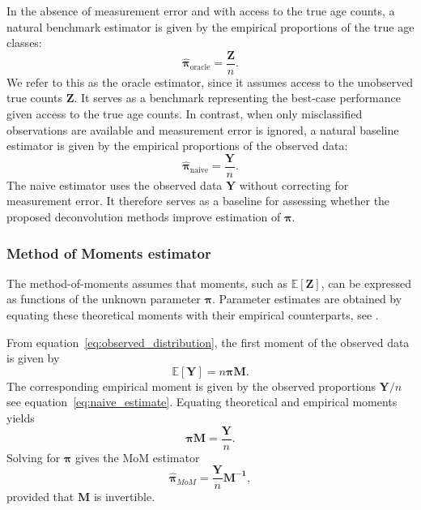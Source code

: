 \documentclass[11pt,a4paper]{article}
\begin{document}
In the absence of measurement error and with access to the true age counts, a natural benchmark estimator is given by the empirical proportions of the true age classes:
\begin{equation*}
	\hat{\boldsymbol{\pi}}_{\text{oracle}} = \frac{\mathbf{Z}}{n}.
	\label{eq:oracle_estimate}
\end{equation*}
We refer to this as the oracle estimator, since it assumes access to the unobserved true counts $\mathbf{Z}$. It serves as a benchmark representing the best-case performance given access to the true age counts. In contrast, when only misclassified observations are available and measurement error is ignored, a natural baseline estimator is given by the empirical proportions of the observed data:
\begin{equation}
	\hat{\boldsymbol{\pi}}_{\text{naive}} = \frac{\mathbf{Y}}{n}.
	\label{eq:naive_estimate}
\end{equation}
The naive estimator uses the observed data $\mathbf{Y}$ without correcting for measurement error. It therefore serves as a baseline for assessing whether the proposed deconvolution methods improve estimation of $\boldsymbol{\pi}$.


\subsubsection{Method of Moments estimator}

The method-of-moments assumes that moments, such as $\mathbb{E}[\mathbf{Z}]$, can be expressed as functions of the unknown parameter $\boldsymbol{\pi}$. Parameter estimates are obtained by equating these theoretical moments with their empirical counterparts, see \cite[p.~275]{AlmBritton2008}. 

From equation~\eqref{eq:observed_distribution}, the first moment of the observed data is given by
\begin{equation*}
	\mathbb{E}[\boldsymbol{Y}] = n  \boldsymbol{\pi} \boldsymbol{M}.
\end{equation*}
The corresponding empirical moment is given by the observed proportions $\boldsymbol{Y}/n$ see equation~\eqref{eq:naive_estimate}. Equating theoretical and empirical moments yields
\begin{equation*}
	 \boldsymbol{\pi} \boldsymbol{M} = \frac{\boldsymbol{Y}}{n}.
\end{equation*}
Solving for $\boldsymbol{\pi}$ gives the MoM estimator
\begin{equation*}
	\hat{\boldsymbol{\pi}}_{MoM} =  \frac{\boldsymbol{Y}}{n}\boldsymbol{M^{-1}},
\end{equation*}
provided that $\boldsymbol{M}$ is invertible.
\end{document}

